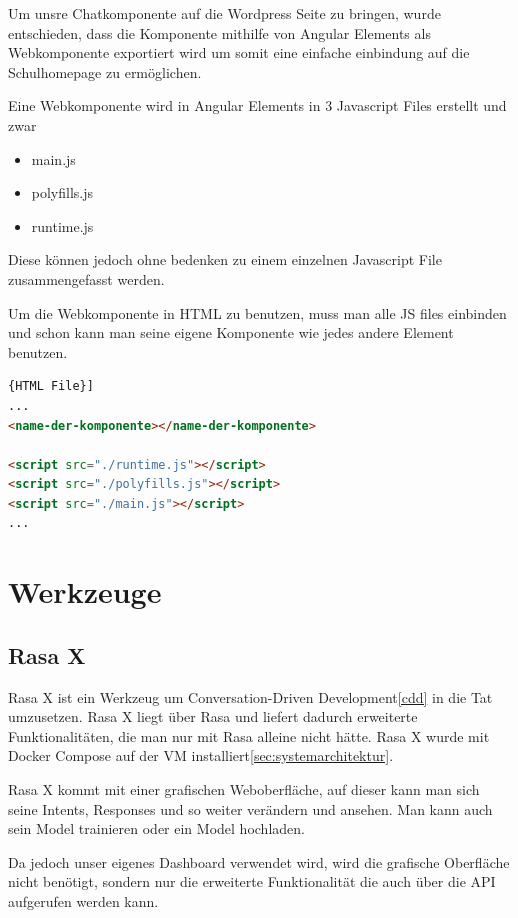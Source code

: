 Um unsre Chatkomponente auf die Wordpress Seite zu bringen, wurde entschieden, dass die Komponente mithilfe von Angular Elements als Webkomponente exportiert wird um somit eine einfache einbindung auf die Schulhomepage zu ermöglichen.

Eine Webkomponente wird in Angular Elements in 3 Javascript Files erstellt und zwar

\begin{itemize}
    \item main.js
    \item polyfills.js
    \item runtime.js
\end{itemize}

Diese können jedoch ohne bedenken zu einem einzelnen Javascript File zusammengefasst werden.

Um die Webkomponente in HTML zu benutzen, muss man alle JS files einbinden und schon kann man seine eigene Komponente wie jedes andere Element benutzen.
\begin{lstlisting}[language=html,label={lst:webcomponent},caption={HTML File}]{HTML File}]
...
<name-der-komponente></name-der-komponente>

<script src="./runtime.js"></script>
<script src="./polyfills.js"></script>
<script src="./main.js"></script>
...
\end{lstlisting}

\section{Werkzeuge}

\subsection{Rasa X}\label{subsec:rasa-x}
Rasa X ist ein Werkzeug um Conversation-Driven Development\ref{cdd} in die Tat umzusetzen\cite{rasax}.
Rasa X liegt über Rasa und liefert dadurch erweiterte Funktionalitäten, die man nur mit Rasa alleine nicht hätte.
Rasa X wurde mit Docker Compose\cite{rasaxDocker} auf der VM installiert\ref{sec:systemarchitektur}.

Rasa X kommt mit einer grafischen Weboberfläche, auf dieser kann man sich seine Intents, Responses und so weiter verändern und ansehen.
Man kann auch sein Model trainieren oder ein Model hochladen.

Da jedoch unser eigenes Dashboard verwendet wird, wird die grafische Oberfläche nicht benötigt, sondern nur die erweiterte Funktionalität die auch über die API aufgerufen werden kann.

